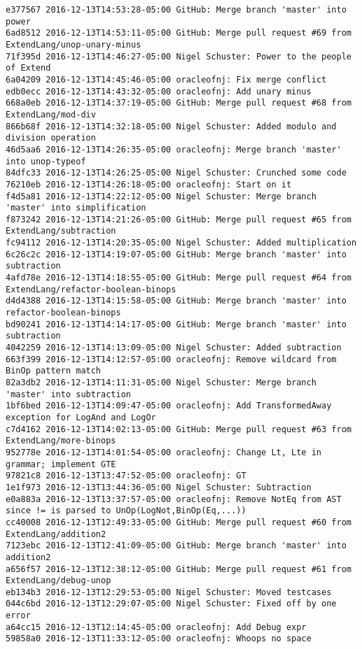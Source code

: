 \begin{lstlisting}
e377567 2016-12-13T14:53:28-05:00 GitHub: Merge branch 'master' into power
6ad8512 2016-12-13T14:53:11-05:00 GitHub: Merge pull request #69 from ExtendLang/unop-unary-minus
71f395d 2016-12-13T14:46:27-05:00 Nigel Schuster: Power to the people of Extend
6a04209 2016-12-13T14:45:46-05:00 oracleofnj: Fix merge conflict
edb0ecc 2016-12-13T14:43:32-05:00 oracleofnj: Add unary minus
668a0eb 2016-12-13T14:37:19-05:00 GitHub: Merge pull request #68 from ExtendLang/mod-div
866b68f 2016-12-13T14:32:18-05:00 Nigel Schuster: Added modulo and division operation
46d5aa6 2016-12-13T14:26:35-05:00 oracleofnj: Merge branch 'master' into unop-typeof
84dfc33 2016-12-13T14:26:25-05:00 Nigel Schuster: Crunched some code
76210eb 2016-12-13T14:26:18-05:00 oracleofnj: Start on it
f4d5a81 2016-12-13T14:22:12-05:00 Nigel Schuster: Merge branch 'master' into simplification
f873242 2016-12-13T14:21:26-05:00 GitHub: Merge pull request #65 from ExtendLang/subtraction
fc94112 2016-12-13T14:20:35-05:00 Nigel Schuster: Added multiplication
6c26c2c 2016-12-13T14:19:07-05:00 GitHub: Merge branch 'master' into subtraction
4afd78e 2016-12-13T14:18:55-05:00 GitHub: Merge pull request #64 from ExtendLang/refactor-boolean-binops
d4d4388 2016-12-13T14:15:58-05:00 GitHub: Merge branch 'master' into refactor-boolean-binops
bd90241 2016-12-13T14:14:17-05:00 GitHub: Merge branch 'master' into subtraction
4042259 2016-12-13T14:13:09-05:00 Nigel Schuster: Added subtraction
663f399 2016-12-13T14:12:57-05:00 oracleofnj: Remove wildcard from BinOp pattern match
82a3db2 2016-12-13T14:11:31-05:00 Nigel Schuster: Merge branch 'master' into subtraction
1bf6bed 2016-12-13T14:09:47-05:00 oracleofnj: Add TransformedAway exception for LogAnd and LogOr
c7d4162 2016-12-13T14:02:13-05:00 GitHub: Merge pull request #63 from ExtendLang/more-binops
952778e 2016-12-13T14:01:54-05:00 oracleofnj: Change Lt, Lte in grammar; implement GTE
97821c8 2016-12-13T13:47:52-05:00 oracleofnj: GT
1e1f973 2016-12-13T13:44:36-05:00 Nigel Schuster: Subtraction
e0a883a 2016-12-13T13:37:57-05:00 oracleofnj: Remove NotEq from AST since != is parsed to UnOp(LogNot,BinOp(Eq,...))
cc40008 2016-12-13T12:49:33-05:00 GitHub: Merge pull request #60 from ExtendLang/addition2
7123ebc 2016-12-13T12:41:09-05:00 GitHub: Merge branch 'master' into addition2
a656f57 2016-12-13T12:38:12-05:00 GitHub: Merge pull request #61 from ExtendLang/debug-unop
eb134b3 2016-12-13T12:29:53-05:00 Nigel Schuster: Moved testcases
044c6bd 2016-12-13T12:29:07-05:00 Nigel Schuster: Fixed off by one error
a64cc15 2016-12-13T12:14:45-05:00 oracleofnj: Add Debug expr
59858a0 2016-12-13T11:33:12-05:00 oracleofnj: Whoops no space

\end{lstlisting}
